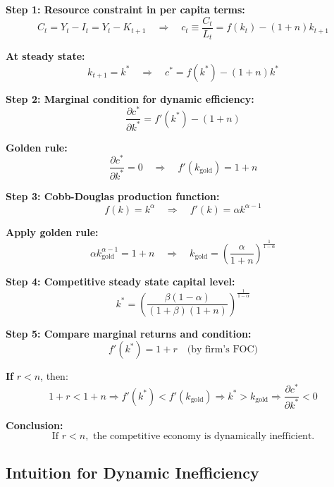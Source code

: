 \documentclass[12pt]{article}
\begin{document}
{\color{blue}
\textbf{Step 1: Resource constraint in per capita terms:}
\[
C_t = Y_t - I_t = Y_t - K_{t+1}
\quad \Rightarrow \quad
c_t \equiv \frac{C_t}{L_t} = f(k_t) - (1 + n) k_{t+1}
\]

\textbf{At steady state:}
\[
k_{t+1} = k^* \quad \Rightarrow \quad
c^* = f(k^*) - (1 + n)k^*
\]

\textbf{Step 2: Marginal condition for dynamic efficiency:}
\[
\frac{\partial c^*}{\partial k^*} = f'(k^*) - (1 + n)
\]

\textbf{Golden rule:}
\[
\frac{\partial c^*}{\partial k^*} = 0 \quad \Rightarrow \quad f'(k_{\text{gold}}) = 1 + n
\]

\textbf{Step 3: Cobb-Douglas production function:}
\[
f(k) = k^\alpha \quad \Rightarrow \quad f'(k) = \alpha k^{\alpha - 1}
\]

\textbf{Apply golden rule:}
\[
\alpha k_{\text{gold}}^{\alpha - 1} = 1 + n
\quad \Rightarrow \quad
k_{\text{gold}} = \left( \frac{\alpha}{1 + n} \right)^{\frac{1}{1 - \alpha}}
\]

\textbf{Step 4: Competitive steady state capital level:}
\[
k^* = \left( \frac{\beta(1 - \alpha)}{(1 + \beta)(1 + n)} \right)^{\frac{1}{1 - \alpha}}
\]

\textbf{Step 5: Compare marginal returns and condition:}
\[
f'(k^*) = 1 + r
\quad \text{(by firm's FOC)}
\]

\textbf{If } \( r < n \), then:
\[
1 + r < 1 + n \Rightarrow f'(k^*) < f'(k_{\text{gold}})
\Rightarrow k^* > k_{\text{gold}}
\Rightarrow \frac{\partial c^*}{\partial k^*} < 0
\]

\textbf{Conclusion:}
\[
\text{If } r < n, \text{ the competitive economy is dynamically inefficient.}
\]
}

\subsection*{\noindent\textbf{Intuition for Dynamic Inefficiency}}
\end{document}

